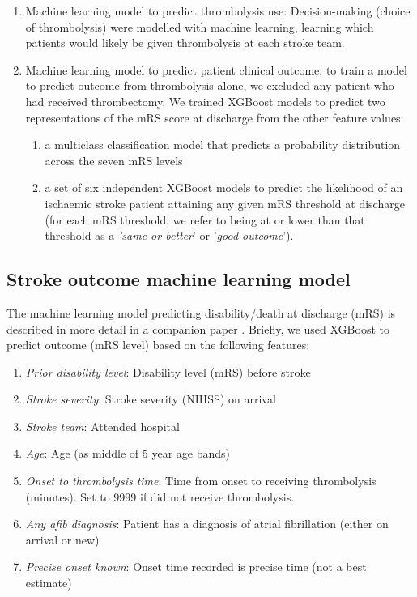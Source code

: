 \begin{enumerate}
    \item Machine learning model to predict thrombolysis use: Decision-making (choice of thrombolysis) were modelled with machine learning, learning which patients would likely be given thrombolysis at each stroke team.
    \item Machine learning model to predict patient clinical outcome: to train a model to predict outcome from thrombolysis alone, we excluded any patient who had received thrombectomy. We trained XGBoost models to predict two representations of the mRS score at discharge from the other feature values: 
    \begin{enumerate}
        \item a multiclass classification model that predicts a probability distribution across the seven mRS levels
        \item a set of six independent XGBoost models to predict the likelihood of an ischaemic stroke patient attaining any given mRS threshold at discharge (for each mRS threshold, we refer to being at or lower than that threshold as a \textit{'same or better}' or '\textit{good outcome}'). 
    \end{enumerate}
\end{enumerate}


\subsection{Stroke outcome machine learning model}

The machine learning model predicting disability/death at discharge (mRS) is described in more detail in a companion paper \cite{pearn_are_2024}. Briefly, we used XGBoost \cite{chen_xgboost_2016} to predict outcome (mRS level) based on the following features:

\begin{enumerate}
    \item \textit{Prior disability level}: Disability level (mRS) before stroke
    \item \textit{Stroke severity}: Stroke severity (NIHSS) on arrival
    \item \textit{Stroke team}: Attended hospital
    \item \textit{Age}: Age (as middle of 5 year age bands)
    \item \textit{Onset to thrombolysis time}: Time from onset to receiving thrombolysis (minutes). Set to 9999 if did not receive thrombolysis.
    \item \textit{Any afib diagnosis}: Patient has a diagnosis of atrial fibrillation (either on arrival or new)
    \item \textit{Precise onset known}: Onset time recorded is precise time (not a best estimate)
\end{enumerate}

